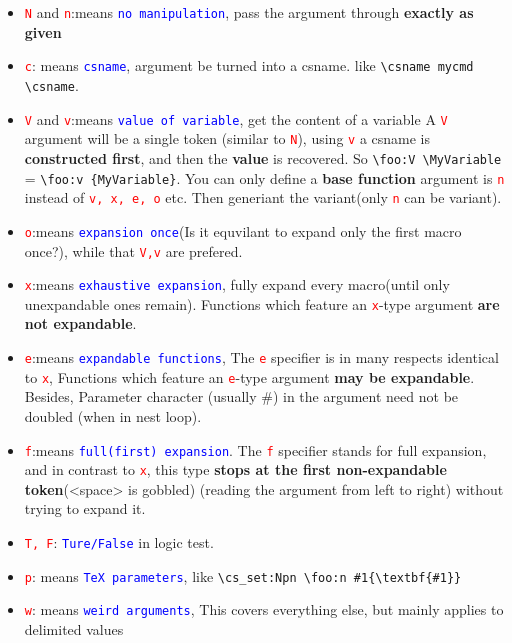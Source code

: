 \documentclass{article}
\begin{document}
\def\c#1{\textcolor{red}{\texttt{#1}}}
\def\diff#1{\textcolor{blue}{\texttt{#1}}}
\begin{itemize}
  \item \c{N} and \c{n}:means \diff{no manipulation}, pass the argument through \textbf{exactly as given}
  \item \c{c}: means \diff{csname}, argument be turned into a csname. like \verb|\csname mycmd \csname|.
  \item \c{V} and \c{v}:means \diff{value of variable}, get the content of a variable
    A \c{V} argument will be a single token (similar to \c{N}), using \c{v} a csname is
    \textbf{constructed first}, and then the \textbf{value} is recovered. So \verb|\foo:V \MyVariable| 
    = \verb|\foo:v {MyVariable}|. You can only define a \textbf{base function} argument is \c{n} instead 
    of \c{v, x, e, o} etc. Then generiant the variant(only \c{n} can be variant).
  \item \c{o}:means \diff{expansion once}(Is it equvilant to expand only the first macro once?), while that \c{V,v} are prefered.
  \item \c{x}:means \diff{exhaustive expansion}, fully expand every macro(until only unexpandable ones remain). 
    Functions which feature an \c{x}-type argument \textbf{are not expandable}.
  \item \c{e}:means \diff{expandable functions}, The \c{e} specifier is in many respects identical to \c{x},
    Functions which feature an \c{e}-type argument \textbf{may be expandable}. Besides, Parameter character 
    (usually \#) in the argument need not be doubled (when in nest loop). 
  \item \c{f}:means \diff{full(first) expansion}. The \c{f} specifier stands for full expansion, and in contrast to \c{x}, this type 
    \textbf{stops at the first non-expandable token}(<space> is gobbled) (reading the argument from left to right) without trying 
    to expand it.
  \item \c{T, F}: \diff{Ture/False} in logic test.
  \item \c{p}: means \diff{\TeX{} parameters}, like \verb|\cs_set:Npn \foo:n #1{\textbf{#1}}|
  \item \c{w}: means \diff{weird arguments}, This covers everything else, but mainly applies to delimited values
\end{itemize}
\end{document}
